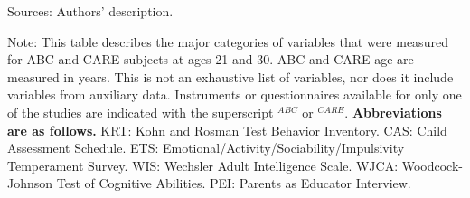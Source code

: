 \begin{sidewaystable}[H]
\begin{threeparttable}
\begin{tabular}{L{3.5cm} C{3.5cm} C{5cm} C{1.5cm} C{1.8cm} C{6cm}}
	&		&							
        \\ \bottomrule							
\end{tabular}										
\begin{tablenotes}									
\scriptsize										
\item Sources: Authors' description. \\				
\item Note: This table describes the major categories of variables that were measured for ABC and CARE subjects at ages 21 and 30. ABC and CARE age are measured in years. This is not an exhaustive list of variables, nor does it include variables from auxiliary data. Instruments or questionnaires available for only one of the studies are indicated with the superscript $^{ABC}$ or $^{CARE}$. \textbf{Abbreviations are as follows.} KRT: Kohn and Rosman Test Behavior Inventory. CAS: Child Assessment Schedule. ETS: Emotional/Activity/Sociability/Impulsivity Temperament Survey. WIS: Wechsler Adult Intelligence Scale. WJCA: Woodcock-Johnson Test of Cognitive Abilities. PEI: Parents as Educator Interview.		\end{tablenotes}									
\end{threeparttable}								
\end{sidewaystable}																			


